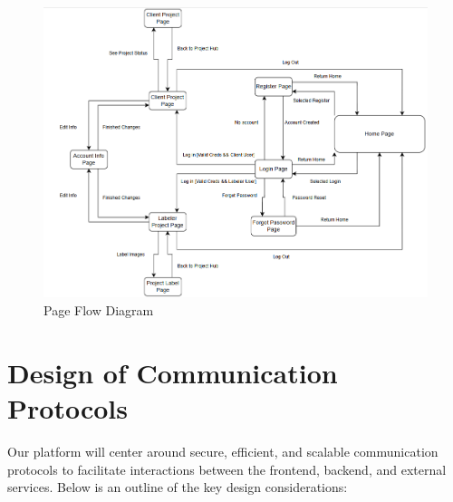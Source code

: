 \documentclass[12pt, titlepage]{article}
\begin{document}
\begin{figure}[H]
    \centering
    \includegraphics[width=\linewidth]{UI_flow.png}
    \caption{Page Flow Diagram}
\end{figure}

\section{Design of Communication Protocols}

Our platform will center around secure, efficient, and scalable communication protocols to facilitate interactions between the frontend, backend, and external services. Below is an outline of the key design considerations:
\end{document}
